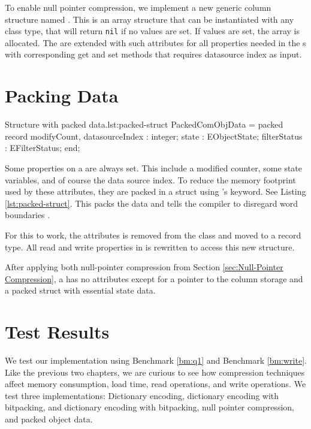 To enable null pointer compression, we implement a new generic column structure named . This is an array structure that can be instantiated with any class type, that will return \texttt{nil} if no values are set. If values are set, the array is allocated. The  are extended with such attributes for all properties needed in the s with corresponding get and set methods that requires datasource index as input.

\section{Packing Data}
\label{sec:Packing Data}
\begin{delphicode}{Structure with packed data.}{lst:packed-struct}
PackedComObjData = packed record
    modifyCount,
    datasourceIndex    : integer; 
    state              : EObjectState;
    filterStatus       : EFilterStatus;
end;
\end{delphicode}
Some properties on a  are always set. This include a modified counter, some state variables, and of course the data source index. To reduce the memory footprint used by these attributes, they are packed in a struct using \delphi's  keyword. See Listing \ref{lst:packed-struct}. This packs the data and tells the compiler to disregard word boundaries \cite{noauthor_undated-vu}.

For this to work, the attributes is removed from the  class and moved to a  record type. All read and write properties in  is rewritten to access this new structure.

After applying both null-pointer compression from Section \ref{sec:Null-Pointer Compression}, a  has no attributes except for a pointer to the column storage and a packed struct with essential state data. 

\section{Test Results}
\label{sec:Test Results}
We test our implementation using Benchmark \ref{bm:q1} and Benchmark \ref{bm:write}. Like the previous two chapters, we are curious to see how compression techniques affect memory consumption, load time, read operations, and write operations. We test three implementations: Dictionary encoding, dictionary encoding with bitpacking, and dictionary encoding with bitpacking, null pointer compression, and packed object data.


